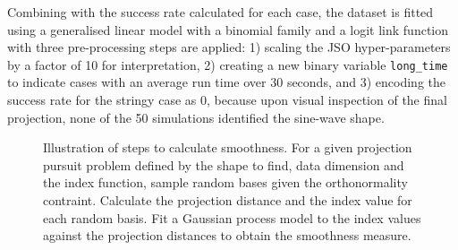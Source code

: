 \documentclass[
  number,
  preprint,
  3p]{elsarticle}
\begin{document}
Combining with the success rate calculated for each case, the dataset is
fitted using a generalised linear model with a binomial family and a
logit link function with three pre-processing steps are applied: 1)
scaling the JSO hyper-parameters by a factor of 10 for interpretation,
2) creating a new binary variable \texttt{long\_time} to indicate cases
with an average run time over 30 seconds, and 3) encoding the success
rate for the stringy case as 0, because upon visual inspection of the
final projection, none of the 50 simulations identified the sine-wave
shape.

\begin{figure}


\caption{\label{fig-smoothness}Illustration of steps to calculate
smoothness. For a given projection pursuit problem defined by the shape
to find, data dimension and the index function, sample random bases
given the orthonormality contraint. Calculate the projection distance
and the index value for each random basis. Fit a Gaussian process model
to the index values against the projection distances to obtain the
smoothness measure.}

\end{figure}%
\end{document}
